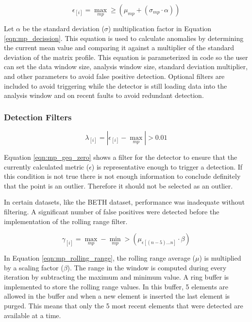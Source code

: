 \begin{equation}
    \label{eqn:mp_decission}
    \epsilon_{[i]} = \max_{mp} \geq \left(\mu_{mp} + \left(\sigma_{mp} \cdot \alpha\right)\right)
\end{equation}


Let $\alpha$ be the standard deviation ($\sigma$) multiplication factor in Equation \eqref{eqn:mp_decission}. This equation is used to calculate anomalies by determining the current mean value and comparing it against a multiplier of the standard deviation of the matrix profile. This equation is parameterized in code so the user can set the data window size, analysis window size, standard deviation multiplier, and other parameters to avoid false positive detection. Optional filters are included to avoid triggering while the detector is still loading data into the analysis window and on recent faults to avoid redundant detection.

\subsubsection{Detection Filters}

\begin{equation}
    \label{eqn:mp_geq_zero}
    \lambda_{[i]} = \left| \epsilon_{[i]} - \max_{mp} \right| > 0.01
\end{equation}

Equation \eqref{eqn:mp_geq_zero} shows a filter for the detector to ensure that the currently calculated metric ($\epsilon$) is representative enough to trigger a detection. If this condition is not true there is not enough information to conclude definitely that the point is an outlier. Therefore it should not be selected as an outlier.

In certain datasets, like the BETH dataset, performance was inadequate without filtering. A significant number of false positives were detected before the implementation of the rolling range filter.

\begin{equation}
    \label{eqn:mp_rolling_range}
    \gamma_{[i]} = \max_{mp} - \min_{mp} > \left(\mu_{\epsilon[(n-5)...n]} \cdot \beta \right)
\end{equation}

In Equation \eqref{eqn:mp_rolling_range}, the rolling range average ($\mu$) is multiplied by a scaling factor ($\beta$). The range in the window is computed during every iteration by subtracting the maximum and minimum value. A ring buffer is implemented to store the rolling range values. In this buffer, 5 elements are allowed in the buffer and when a new element is inserted the last element is purged. This means that only the 5 most recent elements that were detected are available at a time.

